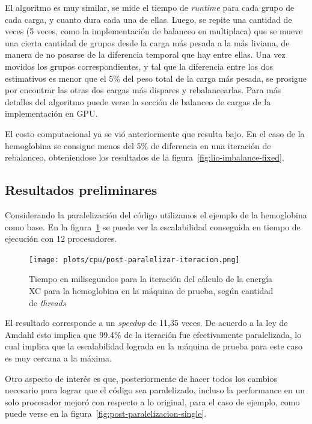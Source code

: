 El algoritmo es muy similar, se mide el tiempo de \textit{runtime} para cada
grupo de cada carga, y cuanto dura cada una de ellas. Luego, se repite una
cantidad de veces (5 veces, como la implementaci\'on de balanceo en multiplaca)
que se mueve una cierta cantidad de grupos desde la carga m\'as pesada a la
m\'as liviana, de manera de no pasarse de la diferencia temporal que hay entre
ellas. Una vez movidos los grupos correspondientes, y tal que la diferencia
entre los dos estimativos es menor que el 5\% del peso total de la carga m\'as
pesada, se prosigue por encontrar las otras dos cargas m\'as dispares y
rebalancearlas. Para m\'as detalles del algoritmo puede verse la secci\'on
de balanceo de cargas de la implementaci\'on en GPU.

El costo computacional ya se vi\'o anteriormente que resulta bajo. En el caso
de la hemoglobina se consigue menos del 5\% de diferencia en una iteraci\'on
de rebalanceo, obteniendose los resultados de la figura~\ref{fig:lio-imbalance-fixed}.

\subsection{Resultados preliminares}

Considerando la paralelizaci\'on del c\'odigo utilizamos el ejemplo de la
hemoglobina como base. En la figura~\ref{fig:hemo-scale} se puede ver la
escalabilidad conseguida en tiempo de ejecuci\'on con 12 procesadores.

\begin{figure}[htbp]
   \centering
   \texttt{[image: plots/cpu/post-paralelizar-iteracion.png]}
   \caption{Tiempo en milisegundos para la iteración del cálculo de la energía
   XC para la hemoglobina en la máquina de prueba, según cantidad de \textit{threads}}
   \label{fig:hemo-scale}
\end{figure}

El resultado corresponde a un \textit{speedup} de 11,35 veces. De acuerdo
a la ley de Amdahl esto implica que 99.4\% de la iteraci\'on fue efectivamente
paralelizada, lo cual implica que la escalabilidad lograda en la m\'aquina de
prueba para este caso es muy cercana a la m\'axima.

Otro aspecto de inter\'es es que, posteriormente de hacer todos los cambios
necesario para lograr que el c\'odigo sea paralelizado, incluso la performance
en un solo procesador mejor\'o con respecto a lo original, para el caso de ejemplo,
como puede verse en la figura~\ref{fig:post-paralelizacion-single}.

